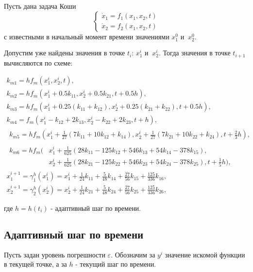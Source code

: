 \documentclass[a4paper,12pt]{article}
\begin{document}
Пусть дана задача Коши
\begin{equation*}
  \begin{cases} \dot{x}_1=f_1(x_1,x_2,t)\\ \dot{x}_2=f_2(x_1,x_2,t) \end{cases}
\end{equation*}
с известными в начальный момент времени значениями \(x_1^0\) и \(\ x_2^0\).

Допустим уже найдены значения в точке \(t_i\): \(x_1^{i}\) и \(\ x_2^{i}\). Тогда значения в точке \(t_{i+1}\) вычисляются по
схеме:

\begin{gather*}
  k_{m1}=h f_m(x_1^{i},x_2^{i}, t), \\ 
  k_{m2}=h f_m(x_1^{i} + 0.5 k_{11},x_2^{i} + 0.5 k_{21}, t + 0.5 h), \\ 
  k_{m3}=h f_m(x_1^{i} + 0.25 (k_{11}+k_{12}),x_2^{i} + 0.25 (k_{21}+k_{22}), t + 0.5 h),\\
  k_{m4}=f_m(x_1^{i} - k_{12} + 2 k_{13},x_2^{i} - k_{22} + 2 k_{23}, t + h),\\
  \begin{align*}
    k_{m5}=h f_m(x_1^{i} + \frac{1}{27}(7 k_{11}+10 k_{12}+k_{14}), x_2^{i} + \frac{1}{27}(7 k_{21}+10 k_{22}+k_{24}), t + \frac{2}{3} h),
  \end{align*} \\
  \begin{align*}
    k_{m6}=h f_m( & x_1^{i} + \frac{1}{625}(28 k_{11}-125 k_{12}+ 546 k_{13}+54 k_{14}-378 k_{15}),                      \\
                  & x_2^{i} + \frac{1}{625}(28 k_{21}-125 k_{22}+ 546 k_{23}+54 k_{24}-378 k_{25}), t + \frac{1}{5} h),
  \end{align*} \\
  x_1^{i+1}=\gamma_1^h(x_1^{i})=x_1^{i} + \frac{1}{24}k_{11} + \frac{5}{48} k_{14} + \frac{27}{56} k_{15} + \frac{125}{336} k_{16}, \\ 
  x_2^{i+1}=\gamma_2^h(x_2^{i})=x_2^{i} + \frac{1}{24}k_{21} + \frac{5}{48} k_{24} + \frac{27}{56} k_{25} + \frac{125}{336} k_{26},
\end{gather*}

где \(h=h(t_i)\) - адаптивный шаг по времени.

\subsection*{Адаптивный шаг по времени}

Пусть задан уровень погрешности \(\varepsilon\). Обозначим за \(y^{i}\)
значение искомой функции в текущей точке, а за \(h\) - текущий шаг по
времени.
\end{document}
